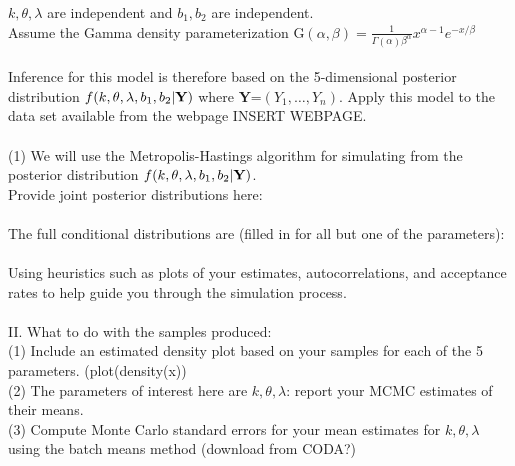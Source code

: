 \documentclass[11pt]{article}
\begin{document}
$k,\theta,\lambda$ are independent and $b_1,b_2$ are independent. \\ Assume the Gamma density parameterization G$(\alpha,\beta) = \frac{1}{\Gamma(\alpha)\beta^{\alpha}} x^{\alpha-1} e^{-x/\beta}$\\\\
Inference for this model is therefore based on the 5-dimensional
posterior distribution $f(k,\theta,\lambda,b_1,b_2| {\bf Y})$ where
{\bf Y}=$(Y_1,\dots,Y_n)$. Apply this model to the data set available from the webpage 
INSERT WEBPAGE.\\\\
(1) We will use the Metropolis-Hastings algorithm for simulating from the
posterior distribution $f(k,\theta,\lambda,b_1,b_2| {\bf Y})$.\\
Provide joint posterior distributions here: \\\\
The full conditional distributions are (filled in for all but one of the parameters):\\\\
Using heuristics such as plots of your estimates,
autocorrelations, and acceptance rates to help guide you through the
simulation process. \\\\
II. What to do with the samples produced:\\
(1) Include an estimated density plot based on your samples for each of
the 5 parameters. (plot(density(x))\\
(2) The parameters of interest here are $k,\theta,\lambda$: report
your MCMC estimates of their means.\\%
(3) Compute Monte Carlo standard errors for your mean estimates for
$k,\theta,\lambda$ using the batch means method (download from CODA?)\\\\
\end{document}

